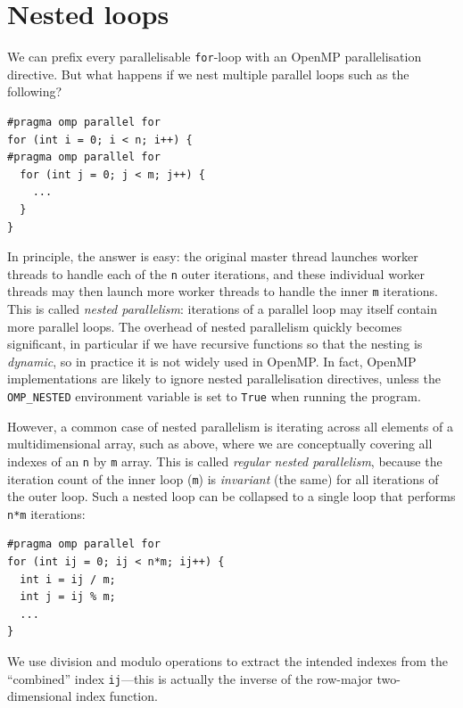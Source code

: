 \section{Nested loops}
\label{sec:openmp-nesting}

We can prefix every parallelisable \lstinline{for}-loop with an OpenMP
parallelisation directive.  But what happens if we nest multiple
parallel loops such as the following?

\begin{lstlisting}
#pragma omp parallel for
for (int i = 0; i < n; i++) {
#pragma omp parallel for
  for (int j = 0; j < m; j++) {
    ...
  }
}
\end{lstlisting}

In principle, the answer is easy: the original master thread launches
worker threads to handle each of the \texttt{n} outer iterations, and
these individual worker threads may then launch more worker threads to
handle the inner \texttt{m} iterations.  This is called \emph{nested
  parallelism}: iterations of a parallel loop may itself contain more
parallel loops.  The overhead of nested parallelism quickly becomes
significant, in particular if we have recursive functions so that the
nesting is \emph{dynamic}, so in practice it is not widely used in
OpenMP.  In fact, OpenMP implementations are likely to ignore nested
parallelisation directives, unless the \lstinline{OMP_NESTED}
environment variable is set to \lstinline{True} when running the
program.

However, a common case of nested parallelism is iterating across all
elements of a multidimensional array, such as above, where we are
conceptually covering all indexes of an \texttt{n} by \texttt{m}
array.  This is called \emph{regular nested parallelism}, because the
iteration count of the inner loop (\texttt{m}) is \emph{invariant}
(the same) for all iterations of the outer loop.  Such a nested loop
can be collapsed to a single loop that performs \texttt{n*m} iterations:

\begin{minipage}{1.0\linewidth}
\begin{lstlisting}
#pragma omp parallel for
for (int ij = 0; ij < n*m; ij++) {
  int i = ij / m;
  int j = ij % m;
  ...
}
\end{lstlisting}
\end{minipage}

We use division and modulo operations to extract the intended indexes
from the ``combined'' index \texttt{ij}---this is actually the inverse
of the row-major two-dimensional index function.

